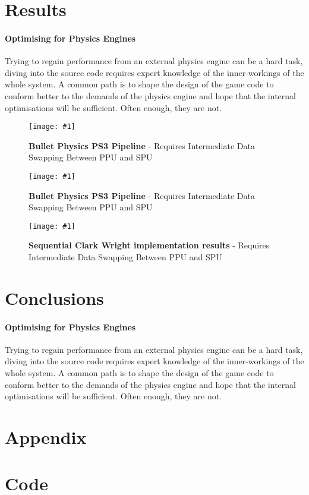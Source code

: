 \documentclass[conference]{acmsiggraph}
\newcommand{\figuremacroW}[4]{
	\begin{figure}[h] %
		\centering
		\texttt{[image: \#1]}
		\caption[#2]{\textbf{#2} - #3}
		\label{fig:#1}
	\end{figure}
}
\newcommand{\figuremacroF}[4]{
	\begin{figure*}[h] %
		\centering
		\texttt{[image: \#1]}
		\caption[#2]{\textbf{#2} - #3}
		\label{fig:#1}
	\end{figure*}
}
\begin{document}
\section{Results}
\paragraph{Optimising for Physics Engines}
Trying to regain performance from an external physics engine can be a hard task, diving into the source code requires expert knowledge of the inner-workings of the whole system. A common path is to shape the design of the game code to conform better to the demands of the physics engine and hope that the internal optimisations  will be sufficient. Often enough, they are not.

\figuremacroW
{rand00040cwsn}
{Bullet Physics PS3 Pipeline}
{Requires Intermediate Data Swapping Between PPU and SPU}
{0.8}

\figuremacroW
{rand00020cwsn}
{Bullet Physics PS3 Pipeline}
{Requires Intermediate Data Swapping Between PPU and SPU}
{0.8}

\lipsum

\figuremacroF
{chart1}
{Sequential Clark Wright implementation results}
{Requires Intermediate Data Swapping Between PPU and SPU}
{1.0}

\section{Conclusions}

\paragraph{Optimising for Physics Engines}
Trying to regain performance from an external physics engine can be a hard task, diving into the source code requires expert knowledge of the inner-workings of the whole system. A common path is to shape the design of the game code to conform better to the demands of the physics engine and hope that the internal optimisations  will be sufficient. Often enough, they are not.

\section{Appendix}





\clearpage
\section{Code}
\end{document}
